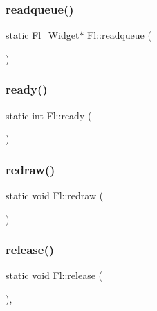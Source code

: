 \subsubsection{\texorpdfstring{readqueue()}{readqueue()}}
{\footnotesize\ttfamily static \hyperlink{class_fl___widget}{Fl\+\_\+\+Widget}$\ast$ Fl\+::readqueue (\begin{DoxyParamCaption}{ }\end{DoxyParamCaption})\hspace{0.3cm}{\ttfamily [static]}}

\mbox{\label{class_fl_abf5b12a179ade86d1daac4157486abb2}} 
\subsubsection{\texorpdfstring{ready()}{ready()}}
{\footnotesize\ttfamily static int Fl\+::ready (\begin{DoxyParamCaption}{ }\end{DoxyParamCaption})\hspace{0.3cm}{\ttfamily [static]}}

\mbox{\label{class_fl_a738d22d7da6af5433ee6e35bee264316}} 
\subsubsection{\texorpdfstring{redraw()}{redraw()}}
{\footnotesize\ttfamily static void Fl\+::redraw (\begin{DoxyParamCaption}{ }\end{DoxyParamCaption})\hspace{0.3cm}{\ttfamily [static]}}

\mbox{\label{class_fl_a656023b0db49ae9b88e277ccdb27ce1b}} 
\subsubsection{\texorpdfstring{release()}{release()}}
{\footnotesize\ttfamily static void Fl\+::release (\begin{DoxyParamCaption}{ }\end{DoxyParamCaption})\hspace{0.3cm}{\ttfamily [inline]}, {\ttfamily [static]}}

